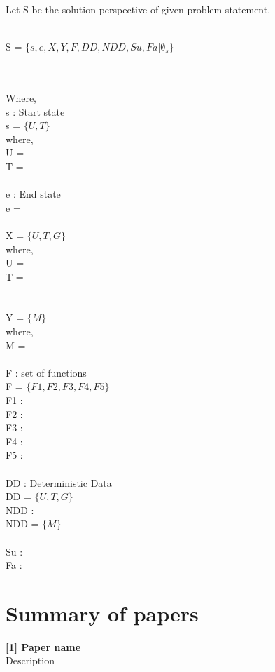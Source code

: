 \documentclass[oneside,a4paper,12pt, times]{book}
\begin{document}
\begin{appendices}
Let S be the solution perspective of given problem statement.
\\
\\
\centerline{S = $\{s, e, X, Y, F, DD, NDD, Su, Fa | \emptyset_s\}$}
\\
\\
Where,\\
s : Start state\\
s = $\{U,T\}$\\
\-\hspace{1cm}where, \\
\-\hspace{1cm}U = \\
\-\hspace{1cm}T = \\
\\
e : End state\\
e = \\
\\
X = $\{U,T,G\}$\\
\-\hspace{1cm}where, \\
\-\hspace{1cm}U = \\
\-\hspace{1cm}T = \\
\\
\\
Y = $\{M\}$\\
\-\hspace{1cm}where, \\
\-\hspace{1cm}M = 
\\
\\
F : set of functions\\
F = $\{F1, F2, F3, F4, F5\}$\\
F1 : \\
F2 : \\
F3 : \\
F4 : \\
F5 : \\
\\
DD : Deterministic Data\\
DD = $\{U, T, G\}$\\
NDD : \\
NDD = $\{M\}$\\\\
Su :\\
Fa : \\



\chapter{Summary of papers}
  \textbf{[1] Paper name}
   \\
   Description\\
\\


\end{appendices}
\end{document}
